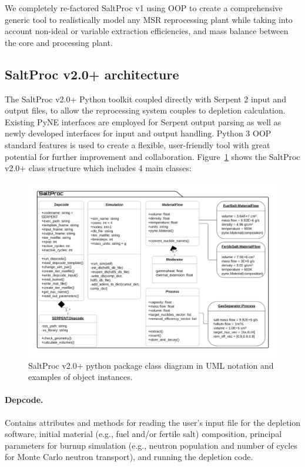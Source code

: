 \documentclass[12pt]{article} %
\begin{document}
We completely re-factored SaltProc v1 using \gls{OOP} to create a 
comprehensive generic tool to realistically model any \gls{MSR} 
reprocessing plant while taking into account non-ideal or variable extraction 
efficiencies, and mass balance between the core and processing plant.

\subsection{SaltProc v2.0+ architecture}
The SaltProc v2.0+ Python toolkit coupled directly with Serpent 2 input 
and output files, to allow the reprocessing system couples to depletion calculation. 
Existing PyNE interfaces are employed for Serpent output parsing as 
well as newly developed interfaces for input and output handling. 
Python 3 \gls{OOP} standard features is used to create a flexible, 
user-friendly tool with great potential for further improvement and 
collaboration. 
Figure~\ref{fig:saltproc_class} shows the SaltProc v2.0+ class structure 
which includes 4 main classes:
\begin{figure}[ht!] %
  \includegraphics[width=1.07\textwidth]{saltproc_class_diagram.png}
  	  	\vspace{-0.35in}
  \caption{SaltProc v2.0+ python package class diagram in UML notation 
  and examples of object instances.}
  \label{fig:saltproc_class}
\end{figure}
	\paragraph{Depcode.}Contains attributes and methods for 
	reading the user's input file for the depletion software, initial 
	material (e.g., fuel and/or fertile salt) composition, principal 
	parameters for 
	burnup simulation (e.g., neutron population and number of cycles for Monte 
	Carlo neutron transport), and running the depletion code.
\end{document}
